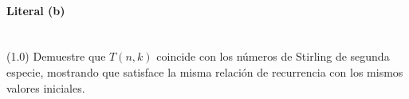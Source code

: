 \paragraph{Literal (b)}\mbox{}\\
(1.0) Demuestre que \(T(n,k)\) coincide con los números de Stirling de segunda especie, mostrando que satisface la misma relación de recurrencia con los mismos valores iniciales.
